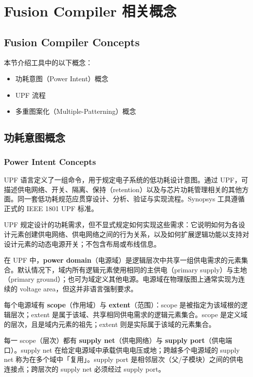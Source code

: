 \section{Fusion Compiler 相关概念}
\subsection*{Fusion Compiler Concepts}

本节介绍工具中的以下概念：
\begin{itemize}
  \item 功耗意图（Power Intent）概念
  \item UPF 流程
  \item 多重图案化（Multiple-Patterning）概念
\end{itemize}

\subsection{功耗意图概念}
\subsubsection*{Power Intent Concepts}

UPF 语言定义了一组命令，用于规定电子系统的低功耗设计意图。通过 UPF，可描述供电网络、开关、隔离、保持（retention）以及与芯片功耗管理相关的其他方面。同一套低功耗规范应贯穿设计、分析、验证与实现流程。Synopsys 工具遵循正式的 IEEE 1801 UPF 标准。

UPF 规定设计的功耗需求，但不显式规定如何实现这些需求：它说明如何为各设计元素创建供电网络、供电网络之间的行为关系，以及如何扩展逻辑功能以支持对设计元素的动态电源开关；不包含布局或布线信息。

在 UPF 中，\textbf{power domain}（电源域）是逻辑层次中共享一组供电需求的元素集合。默认情况下，域内所有逻辑元素使用相同的主供电（primary supply）与主地（primary ground）；也可为域定义其他电源。电源域在物理版图上通常实现为连续的 voltage area，但这并非语言强制要求。

每个电源域有 \textbf{scope}（作用域）与 \textbf{extent}（范围）：scope 是被指定为该域根的逻辑层次；extent 是属于该域、共享相同供电需求的逻辑元素集合。scope 是定义域的层次，且是域内元素的祖先；extent 则是实际属于该域的元素集合。

每一 scope（层次）都有 \textbf{supply net}（供电网络）与 \textbf{supply port}（供电端口）。supply net 在给定电源域中承载供电电压或地；跨越多个电源域的 supply net 称为在多个域中「复用」。supply port 是相邻层次（父/子模块）之间的供电连接点；跨层次的 supply net 必须经过 supply port。

